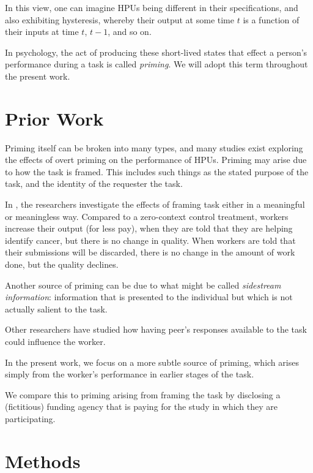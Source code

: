 \documentclass[letterpaper, 11pt, twocolumn]{article}
\begin{document}
In this view, one can imagine HPUs being different in their specifications,
and also exhibiting hysteresis, whereby their output at some time $t$ is a
function of their inputs at time $t$, $t-1$, and so on.

In psychology, the act of producing these short-lived states that effect a
person's performance during a task is called \textit{priming}.  We will adopt
this term throughout the present work.


\section*{Prior Work}
Priming itself can be broken into many types, and many studies exist exploring
the effects of overt priming on the performance of HPUs. Priming may arise
due to how the task is framed.  This includes such things as the stated
purpose of the task, and the identity of the requester the task.

In \cite{chandler2013breaking}, the researchers investigate the effects of 
framing task either in a meaningful or meaningless way.  Compared to a 
zero-context control treatment, workers increase their output (for less pay),
when they are told that they are helping identify cancer, but there is no
change in quality.  When workers are told that their submissions will be 
discarded, there is no change in the amount of work done, but the quality 
declines.

Another source of priming can be due to what might be called 
\textit{sidestream information}: information that is presented to the 
individual but which is not actually salient to the task.

Other researchers have studied how having peer's responses available to 
the task could influence the worker.

In the present work, we focus on a more subtle source of priming, which arises
simply from the worker's performance in earlier stages of the task. 

We compare this to priming arising from framing the task by disclosing a 
(fictitious) funding agency that is paying for the study in which they are 
participating.

\section*{Methods}



\end{document}
